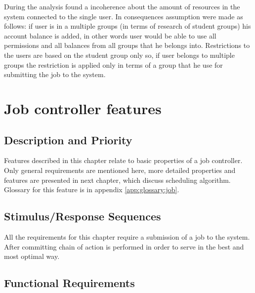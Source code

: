 \documentclass{report}
\begin{document}
	During the analysis found a incoherence about the amount of resources in the system connected to the single user. In consequences assumption were made as follows: if user is in a multiple groups (in terms of research of student groups) his account balance is added, in other words user would be able to use all permissions and all balances from all groups that he belongs into. Restrictions to the users are based on the student group only so, if user belongs to multiple groups the restriction is applied only in terms of a group that he use for submitting the job to the system.


\section{Job controller features} \label{sec:jcf}

\subsection{Description and Priority}
Features described in this chapter relate to basic properties of a job controller. Only general requirements are mentioned here, more detailed properties and features are presented in next chapter, which discuss scheduling algorithm. Glossary for this feature is in appendix \ref{app:glossary:job}.

\subsection{Stimulus/Response Sequences}
All the requirements for this chapter require a submission of a job to the system. After committing chain of action is performed in order to serve in the best and most optimal way.
\subsection{Functional Requirements}
\end{document}
